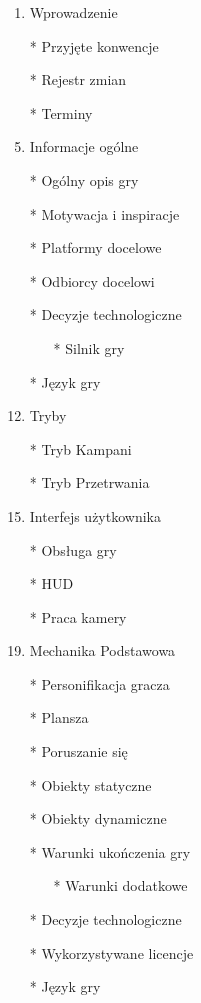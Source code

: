 \documentclass{article}
\begin{document}
\newpage
{}
\begin{enumerate}
	\item Wprowadzenie
	    \item[*] Przyjęte konwencje
	    \item[*] Rejestr zmian
	    \item[*] Terminy
	\item Informacje ogólne
	    \item[*] Ogólny opis gry
	    \item[*] Motywacja i inspiracje
	    \item[*] Platformy docelowe
	    \item[*] Odbiorcy docelowi
	    \item[*] Decyzje technologiczne
	       \begin{enumerate}
	    \item[*] Silnik gry
	    \end{enumerate}
	    \item[*] Język gry
	\item Tryby
	    \item[*] Tryb Kampani
	    \item[*] Tryb Przetrwania
    \item Interfejs użytkownika
        \item[*] Obsługa gry
	    \item[*] HUD
	    \item[*] Praca kamery
	    
	\item Mechanika Podstawowa
	    \item[*] Personifikacja gracza
	    \item[*] Plansza
	    \item[*] Poruszanie się
	    \item[*] Obiekty statyczne 
	    
	    \item[*] Obiekty dynamiczne 
	    
	    \item[*] Warunki ukończenia gry 
	    \begin{enumerate}
	    \item[*] Warunki dodatkowe
	    \end{enumerate}
	    
	    \item[*] Decyzje technologiczne
	    \item[*] Wykorzystywane licencje
	    \item[*] Język gry
	    

\end{enumerate}
\end{document}
